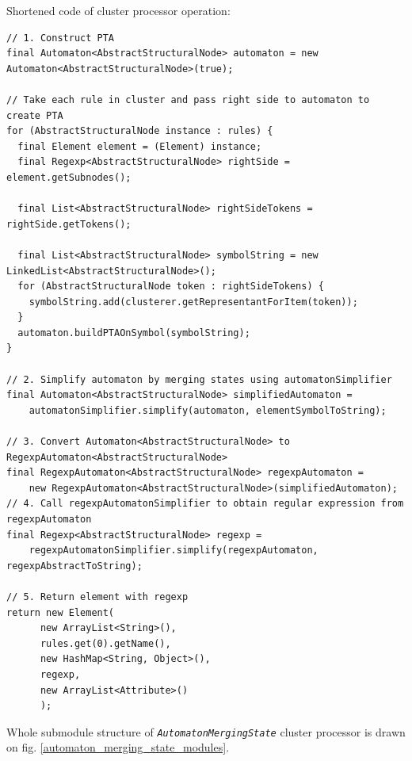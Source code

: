\documentclass[a4paper,10pt,oneside]{article}
\newcommand{\jmodule}[1]{\texttt{\textit{#1}}}
\begin{document}
Shortened code of cluster processor operation:
\begin{verbatim}
// 1. Construct PTA
final Automaton<AbstractStructuralNode> automaton = new Automaton<AbstractStructuralNode>(true);

// Take each rule in cluster and pass right side to automaton to create PTA
for (AbstractStructuralNode instance : rules) {
  final Element element = (Element) instance;
  final Regexp<AbstractStructuralNode> rightSide = element.getSubnodes();

  final List<AbstractStructuralNode> rightSideTokens = rightSide.getTokens();

  final List<AbstractStructuralNode> symbolString = new LinkedList<AbstractStructuralNode>();
  for (AbstractStructuralNode token : rightSideTokens) {
    symbolString.add(clusterer.getRepresentantForItem(token));
  }
  automaton.buildPTAOnSymbol(symbolString);
}

// 2. Simplify automaton by merging states using automatonSimplifier
final Automaton<AbstractStructuralNode> simplifiedAutomaton =
    automatonSimplifier.simplify(automaton, elementSymbolToString);

// 3. Convert Automaton<AbstractStructuralNode> to RegexpAutomaton<AbstractStructuralNode>
final RegexpAutomaton<AbstractStructuralNode> regexpAutomaton =
    new RegexpAutomaton<AbstractStructuralNode>(simplifiedAutomaton);
// 4. Call regexpAutomatonSimplifier to obtain regular expression from regexpAutomaton
final Regexp<AbstractStructuralNode> regexp =
    regexpAutomatonSimplifier.simplify(regexpAutomaton, regexpAbstractToString);

// 5. Return element with regexp
return new Element(
      new ArrayList<String>(),
      rules.get(0).getName(),
      new HashMap<String, Object>(),
      regexp,
      new ArrayList<Attribute>()
      );
\end{verbatim}
Whole submodule structure of \jmodule{AutomatonMergingState} cluster processor is drawn on fig. \ref{automaton_merging_state_modules}.
\end{document}
